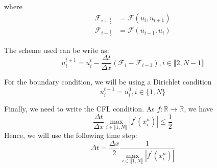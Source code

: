         where 
        \begin{align*}
            \mathcal{F}_{i+\frac{1}{2}}&= \mathcal{F}(u_i, u_{i+1})\\
            \mathcal{F}_{i-\frac{1}{2}}&= \mathcal{F}(u_{i-1}, u_i)
        \end{align*}
        
        The scheme used can be write as:
        \begin{equation}
            u^{t+1}_i=u^t_i - \frac{\Delta t}{\Delta x}(\mathcal{F}_i - \mathcal{F}_{i-1}),i\in\llbracket2,N-1\rrbracket
        \end{equation}
        
        For the boundary condition, we will be using a Dirichlet condition
        \begin{equation*}
             u^{t+1}_i= u_i^0, i \in\{1,N\}
        \end{equation*}
        
        Finally, we need to write the CFL condition. As $f:\mathds{R}\to\mathds{R}$, we have 
        \begin{equation*}
            \frac{\Delta t}{\Delta x}\max_{i\in \llbracket 1,N\rrbracket} |f^\prime\left(x^n_i\right)| \leq \frac{1}{2}
        \end{equation*}
        Hence, we will use the following time step: 
        \begin{equation}
            \Delta t = \frac{\Delta x}{2}\frac{1}{\max_{i\in \llbracket 1,N\rrbracket} |f^\prime\left(x^n_i\right)|}
        \end{equation}
        
